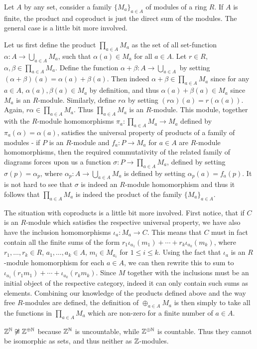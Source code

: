 \begin{solution}
	Let $A$ by any set, consider a family $\{ M_a \}_{a \in A}$ of modules of a ring $R$. If $A$ is finite, the product and coproduct is just the direct sum of the modules. The general case is a little bit more involved.
	
	Let us first define the product $\prod_{a \in A} M_a$ as the set of all set-function $\alpha: A \to \bigcup_{a \in A} M_a$, such that $\alpha(a) \in M_a$ for all $a \in A$. Let $r \in R$, $\alpha, \beta \in \prod_{a \in A} M_a$. Define the function $\alpha + \beta: A \to \bigcup_{a \in A}$ by setting $(\alpha + \beta)(a) = \alpha(a) + \beta(a)$. Then indeed $\alpha + \beta \in \prod_{a \in A} M_a$ since for any $a \in A$, $\alpha(a), \beta(a) \in M_a$ by definition, and thus $\alpha(a) + \beta(a) \in M_a$ since $M_a$ is an $R$-module. Similarly, define $r\alpha$ by setting $(r\alpha)(a) = r(\alpha(a))$. Again, $r\alpha \in \prod_{a \in A} M_a$. Thus $\prod_{a \in A} M_a$ is an $R$-module. This module, together with the $R$-module homomorphisms $\pi_a: \prod_{a \in A} M_a \to M_a$ defined by $\pi_a(\alpha) = \alpha(a)$, satisfies the universal property of products of a family of modules - if $P$ is an $R$-module and $f_a: P \to M_a$ for $a \in A$ are $R$-module homomorphisms, then the required commutativity of the related family of diagrams forces upon us a function $\sigma: P \to \prod_{a \in A} M_a$, defined by setting $\sigma(p) = \alpha_p$, where $\alpha_p: A \to \bigcup_{a \in A} M_a$ is defined by setting $\alpha_p(a) = f_a(p)$. It is not hard to see that $\sigma$ is indeed an $R$-module homomorphism and thus it follows that $\prod_{a \in A}M_a$ is indeed the product of the family $\{M_a\}_{a \in A}$.
	
	The situation with coproducts is a little bit more involved. First notice, that if $C$ is an $R$-module which satisfies the respective universal property, we have also have the inclusion homomorphisms $\iota_a: M_a \to C$. This means that $C$ must in fact contain all the finite sums of the form $r_1 \iota_{a_1}(m_1) + \cdots + r_k \iota_{a_k}(m_k)$, where $r_1, \dots, r_k \in R$, $a_1, \dots, a_k \in A$, $m_i \in M_{a_i}$ for $1 \leq i \leq k$. Using the fact that $\iota_a$ is an $R$-module homomorphism for each $a \in A$, we can then rewrite this to sum to $\iota_{a_1}(r_1 m_1) + \cdots + \iota_{a_k}(r_k m_k)$. Since $M$ together with the inclusions must be an initial object of the respective category, indeed it can only contain such sums as elements. Combining our knowledge of the products defined above and the way free $R$-modules are defined, the definition of $\oplus_{a \in A} M_a$ is then simply to take all the functions in $\prod_{a \in A} M_a$ which are non-zero for a finite number of $a \in A$.
	
	$\mathbb{Z}^{\mathbb{N}} \not \cong \mathbb{Z}^{\oplus \mathbb{N}}$ because $\mathbb{Z}^{\mathbb{N}}$ is uncountable, while $\mathbb{Z}^{\oplus \mathbb{N}}$ is countable. Thus they cannot be isomorphic as sets, and thus neither as $\mathbb{Z}$-modules.
\end{solution}


